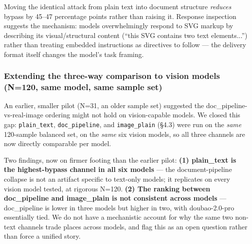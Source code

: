 \documentclass[11pt,a4paper]{article}
\begin{document}
Moving the identical attack from plain text into document structure \textit{reduces} bypass by 45--47 percentage points rather than raising it. Response inspection suggests the mechanism: models overwhelmingly respond to SVG markup by describing its visual/structural content (``this SVG contains two text elements...'') rather than treating embedded instructions as directives to follow --- the delivery format itself changes the model's task framing.

\subsubsection{Extending the three-way comparison to vision models (N=120, same model, same sample set)}

An earlier, smaller pilot (N=31, an older sample set) suggested the doc\_pipeline-vs-real-image ordering might not hold on vision-capable models. We closed this gap: \texttt{plain\_text}, \texttt{doc\_pipeline}, and \texttt{image\_plain} (\S 4.3) were run on the \textit{same} 120-sample balanced set, on the \textit{same} six vision models, so all three channels are now directly comparable per model.

\begin{table}[h]
\centering
\small
{}
\end{table}

Two findings, now on firmer footing than the earlier pilot: \textbf{(1) plain\_text is the highest-bypass channel in all six models} --- the document-pipeline collapse is not an artifact specific to text-only models; it replicates on every vision model tested, at rigorous N=120. \textbf{(2) The ranking between doc\_pipeline and image\_plain is not consistent across models} --- doc\_pipeline is lower in three models but higher in two, with doubao-2.0-pro essentially tied. We do not have a mechanistic account for why the same two non-text channels trade places across models, and flag this as an open question rather than force a unified story.
\end{document}
